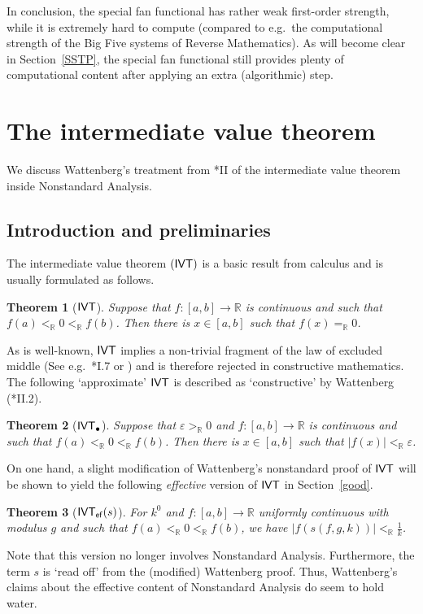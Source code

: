 \documentclass[reqno]{amsart}
\newtheorem{thm}{Theorem}
\def\ef{\textup{\textsf{ef}}}
\def\IVT{\textup{IVT}}
\def\IVT{\textup{\textsf{IVT}}}
\def\R{{\mathbb  R}}
\def\R{{\mathbb{R}}}
\def\di{\rightarrow}
\def\eps{\varepsilon}
\def\IVT{\textup{\textsf{IVT}}}
\numberwithin{equation}{section}
\numberwithin{thm}{section}
\begin{document}
\medskip

In conclusion, the special fan functional has rather weak first-order strength, while it is extremely hard to compute (compared to e.g.\ the computational strength of the Big Five systems of Reverse Mathematics).    As will become clear in Section~\ref{SSTP}, the special fan functional still provides plenty of computational content after applying an extra (algorithmic) step.  




\section{The intermediate value theorem}\label{frastruc}
We discuss Wattenberg's treatment from \cite{watje}*{II} of the intermediate value theorem inside Nonstandard Analysis.  
\subsection{Introduction and preliminaries}
The intermediate value theorem $(\IVT)$ is a basic result from calculus and is usually formulated as follows.  
\begin{thm}[$\IVT$]
Suppose that $f:[a,b]\di \R$ is continuous and such that $f(a)<_{\R}0<_{\R}f(b)$.  Then there is $x\in [a,b]$ such that $f(x)=_{\R}0$.
\end{thm}
As is well-known, $\IVT$ implies a non-trivial fragment of the law of excluded middle (See e.g.\ \cite{beeson1}*{I.7} or \cite{mandje}) and is therefore rejected in constructive mathematics.
The following `approximate' $\IVT$ is described as `constructive' by Wattenberg (\cite{watje}*{II.2}).
\begin{thm}[$\IVT_{\bullet}$]
Suppose that $\eps>_{\R}0$ and $f:[a,b]\di \R$ is continuous and such that $f(a)<_{\R}0<_{\R}f(b)$.  Then there is $x\in [a,b]$ such that $|f(x)|<_{\R}\eps$.
\end{thm}
On one hand, a slight modification of Wattenberg's nonstandard proof of $\IVT$ will be shown to yield the following \emph{effective} version of $\IVT$ in Section~\ref{good}.  
\begin{thm}[$\IVT_{\ef}(s)$]
For $k^{0}$ and $f:[a,b]\di \R$ uniformly continuous with modulus $g$ and such that $f(a)<_{\R}0<_{\R}f(b)$, we have $|f(s(f,g,k))|<_{\R}\frac{1}{k}$.
\end{thm}
Note that this version no longer involves Nonstandard Analysis.  Furthermore, the term $s$ is `read off' from the (modified) Wattenberg proof.  
Thus, Wattenberg's claims about the effective content of Nonstandard Analysis do seem to hold water.  
\end{document}
